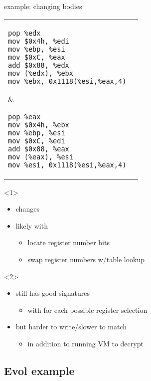 \begin{frame}[fragile,label=regSwap]{example: changing bodies}
\lstset{language=myasm,style=smaller}
\begin{tabular}{ll}
\begin{lstlisting}
pop %edx
mov $0x4h, %edi
mov %ebp, %esi
mov $0xC, %eax
add $0x88, %edx
mov (%edx), %ebx
mov %ebx, 0x1118(%esi,%eax,4)
\end{lstlisting}
&
\begin{lstlisting}
pop %eax
mov $0x4h, %ebx
mov %ebp, %esi
mov $0xC, %edi
add $0x88, %eax
mov (%eax), %esi
mov %esi, 0x1118(%esi,%eax,4)
\end{lstlisting}
\end{tabular}
\begin{onlyenv}<1>
\begin{itemize}
\item {} changes
\item likely with 
    \begin{itemize}
    \item locate register number bits
    \item swap register numbers w/table lookup
    \end{itemize}
\end{itemize}
\end{onlyenv}
\begin{onlyenv}<2>
\begin{itemize}
\item still has good signatures
    \begin{itemize}
    \item with  for each possible register selection
    \end{itemize}
\item but harder to write/slower to match
    \begin{itemize}
    \item in addition to running VM to decrypt
    \end{itemize}
\end{itemize}
\end{onlyenv}
\end{frame}

\subsection{Evol example}

